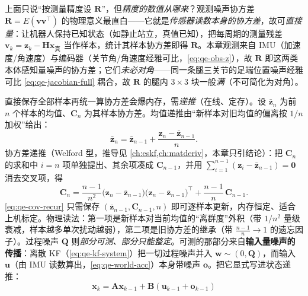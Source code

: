 \begin{derivation}\label{deriv:qe-cov-meas}
上面只说“按测量精度设 $\mathbf{R}$”，但\emph{精度的数值从哪来}？观测噪声协方差 $\mathbf{R}=E(\boldsymbol v\boldsymbol v^\top)$ 的物理意义最直白——它就是\emph{传感器读数本身的协方差}，故可\emph{直接量}：让机器人保持已知状态（如静止站立，真值已知），把每周期的测量残差 $\boldsymbol v_k=\boldsymbol z_k-\mathbf{H}\boldsymbol x_{\text{真}}$ 当作样本，统计其样本协方差即得 $\mathbf{R}$。本章观测来自 IMU（加速度/角速度）与编码器（关节角/角速度经雅可比，\cref{eq:qe-obs-z}），故 $\mathbf{R}$ 即这两类本体感知量噪声的协方差；它们\emph{未必对角}——同一条腿三关节的足端位置噪声经雅可比 \cref{eq:qe-jacobian-full} 耦合，故 $\mathbf{R}$ 的腿内 $3\times3$ 块一般\emph{满}（不可简化为对角）。

直接保存全部样本再统一算协方差会爆内存，需\emph{递推}（在线、定存）。设 $\bar{\boldsymbol z}_n$ 为前 $n$ 个样本的均值、$\mathbf{C}_n$ 为其样本协方差。均值递推由“新样本对旧均值的偏离按 $1/n$ 加权”给出：
\begin{equation}
  \bar{\boldsymbol z}_n = \bar{\boldsymbol z}_{n-1} + \frac{\boldsymbol z_n-\bar{\boldsymbol z}_{n-1}}{n}.
  \label{eq:qe-mean-recur}
\end{equation}
协方差递推（Welford 型，推导见 \cref{ch:eskf,ch:matderiv}，本章只引结论）：把 $\mathbf{C}_n$ 的求和中 $i{=}n$ 项单独提出、其余项凑成 $\mathbf{C}_{n-1}$，并用 $\sum_{i=1}^{n-1}(\boldsymbol z_i-\bar{\boldsymbol z}_{n-1})=\boldsymbol 0$ 消去交叉项，得
\begin{equation}
  \boxed{\;\mathbf{C}_n = \frac{n-1}{n^2}\big(\boldsymbol z_n-\bar{\boldsymbol z}_{n-1}\big)\big(\boldsymbol z_n-\bar{\boldsymbol z}_{n-1}\big)^\top + \frac{n-1}{n}\,\mathbf{C}_{n-1}.\;}
  \label{eq:qe-cov-recur}
\end{equation}
\cref{eq:qe-cov-recur} 只需保存 $(\bar{\boldsymbol z}_{n-1},\mathbf{C}_{n-1},n)$ 即可逐样本更新，内存恒定、适合上机标定。物理读法：第一项是新样本对当前均值的“离群度”外积（带 $1/n^2$ 量级衰减，样本越多单次扰动越弱），第二项是旧协方差的继承（带 $\tfrac{n-1}{n}\!\to\!1$ 的遗忘因子）。过程噪声 $\mathbf{Q}$ 则\emph{部分可测、部分只能整定}。可测的那部分来自\textbf{输入量噪声的传播}：离散 KF（\cref{eq:qe-kf-system}）把一切过程噪声并入 $\boldsymbol w\sim(0,\mathbf{Q})$，而输入 $\boldsymbol u$（由 IMU 读数算出，\cref{eq:qe-world-acc}）本身带噪声 $\boldsymbol o$。把它显式写进状态递推：
\begin{equation}
  \boldsymbol x_k=\mathbf{A}\boldsymbol x_{k-1}+\mathbf{B}(\boldsymbol u_{k-1}+\boldsymbol o_{k-1})

\end{equation}
\end{derivation}
